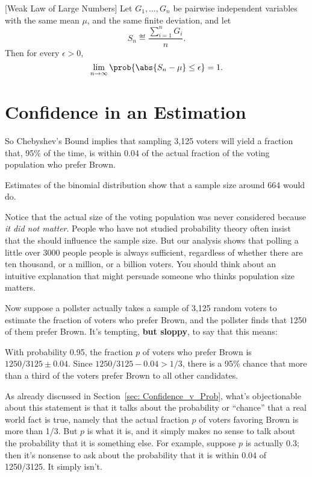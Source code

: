 \begin{corollary}\label{weaklaw}[Weak Law of Large Numbers]
  Let $G_1, \dots, G_n$ be pairwise independent variables with the same
  mean $\mu$, and the same finite deviation, and let
\[
S_n \eqdef \frac{\sum_{i=1}^n G_i}{n}.
\]
Then for every $\epsilon > 0$,
\[
\lim_{n \rightarrow \infty}
        \prob{\abs{S_n - \mu}  \leq \epsilon} = 1.
\]
\end{corollary}

\section{Confidence in an Estimation}\label{sec: estimation_confidence}

So Chebyshev's Bound implies that sampling 3,125 voters will yield a
fraction that, 95\% of the time, is within 0.04 of the actual fraction
of the voting population who prefer Brown.  \begin{editingnotes}
  Estimates of the binomial distribution show that a sample size
  around 664 would do.
\end{editingnotes}

Notice that the actual size of the voting population was never
considered because \emph{it did not matter}.  People who have not
studied probability theory often insist that the 
should influence the sample size.  But our analysis shows that polling
a little over 3000 people people is always sufficient, regardless of
whether there are ten thousand, or a million, or a billion voters.
You should think about an intuitive explanation that might persuade
someone who thinks population size matters.

Now suppose a pollster actually takes a sample of 3,125 random voters to
estimate the fraction of voters who prefer Brown, and the pollster finds
that 1250 of them prefer Brown.  It's tempting, \textbf{but sloppy}, to
say that this means:
\begin{falseclm*}
  With probability 0.95, the fraction $p$ of voters who prefer Brown
  is $1250/3125 \pm 0.04$.  Since $1250/3125 -0.04 > 1/3$, there is a 95\%
  chance that more than a third of the voters prefer Brown to all other
  candidates.
\end{falseclm*}
As already discussed in Section~\ref{sec: Confidence_v_Prob}, what's
objectionable about this statement is that it talks about the
probability or ``chance'' that a real world fact is true, namely that
the actual fraction $p$ of voters favoring Brown is more than 1/3.
But $p$ is what it is, and it simply makes no sense to talk about the
probability that it is something else.  For example, suppose $p$ is
actually 0.3; then it's nonsense to ask about the probability that it
is within 0.04 of 1250/3125.  It simply isn't.

